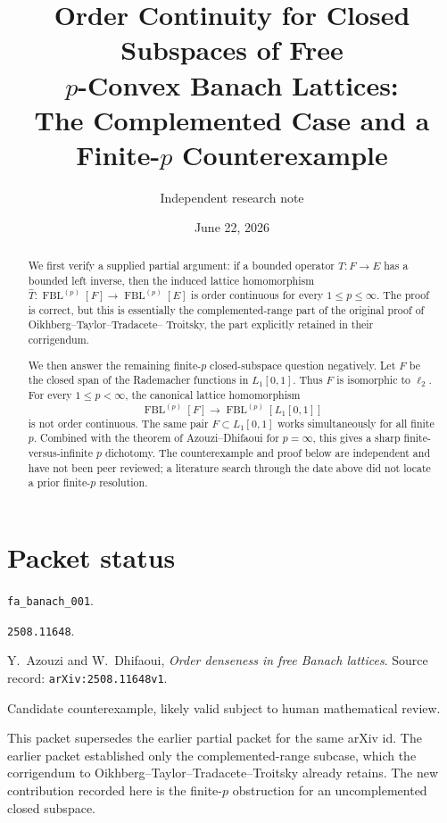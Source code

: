 \documentclass[11pt]{article}
\title{Order Continuity for Closed Subspaces of Free \\[-1mm]
\(p\)-Convex Banach Lattices:\\
The Complemented Case and a Finite-\(p\) Counterexample}
\author{Independent research note}
\date{June 22, 2026}
\theoremstyle{remark}
\newcommand{\FBL}[2]{\operatorname{FBL}^{(#1)}[#2]}
\newcommand{\wh}[1]{\widehat{#1}}
\begin{document}
\maketitle

\begin{abstract}
We first verify a supplied partial argument: if a bounded operator
\(T:F\to E\) has a bounded left inverse, then the induced lattice
homomorphism
\(\wh T:\FBL{p}{F}\to\FBL{p}{E}\) is order continuous for every
\(1\le p\le\infty\).  The proof is correct, but this is essentially the
complemented-range part of the original proof of Oikhberg--Taylor--Tradacete--
Troitsky, the part explicitly retained in their corrigendum.

We then answer the remaining finite-\(p\) closed-subspace question negatively.
Let \(F\) be the closed span of the Rademacher functions in \(L_1[0,1]\).
Thus \(F\) is isomorphic to \(\ell_2\).  For every \(1\le p<\infty\), the
canonical lattice homomorphism
\[
  \FBL{p}{F}\longrightarrow \FBL{p}{L_1[0,1]}
\]
is not order continuous.  The same pair \(F\subset L_1[0,1]\) works
simultaneously for all finite \(p\).  Combined with the theorem of
Azouzi--Dhifaoui for \(p=\infty\), this gives a sharp finite-versus-infinite
\(p\) dichotomy.  The counterexample and proof below are independent and
have not been peer reviewed; a literature search through the date above did
not locate a prior finite-\(p\) resolution.
\end{abstract}

\section*{Packet status}

\begin{description}[leftmargin=2.6cm,style=nextline]
\item[Run] \texttt{fa\_banach\_001}.
\item[Source arXiv id] \texttt{2508.11648}.
\item[Source paper] Y.~Azouzi and W.~Dhifaoui, \emph{Order denseness in free
Banach lattices}.  Source record: \texttt{arXiv:2508.11648v1}.
\item[Packet classification] Candidate counterexample, likely valid subject
to human mathematical review.
\item[Upgrade note] This packet supersedes the earlier partial packet for
the same arXiv id.  The earlier packet established only the complemented-range
subcase, which the corrigendum to Oikhberg--Taylor--Tradacete--Troitsky already
retains.  The new contribution recorded here is the finite-\(p\) obstruction
for an uncomplemented closed subspace.
\end{description}
\end{document}
